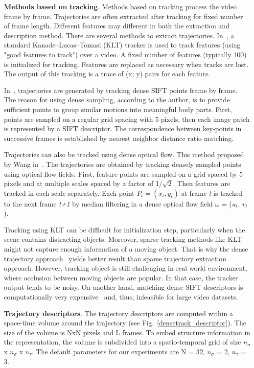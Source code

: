 \textbf{Methods based on tracking}. Methods based on tracking process the video frame by frame. Trajectories are often extracted after tracking for fixed number of frame length. Different features may different in both the extraction and description method. There are several methods to extract trajectories. In~\cite{Matikainen09ICCV}, a standard Kanade–Lucas–Tomasi (KLT) tracker is used to track features (using "good features to track") over a video. A fixed number of features (typically 100) is initialized for tracking. Features are replaced as necessary when tracks are lost. The output of this tracking is a trace of (x; y) pairs for each feature.

In~\cite{Yuan12PR}, trajectories are generated by tracking dense SIFT points frame by frame. The reason for using dense sampling, according to the author, is to provide sufficient points to group similar motions into meaningful body parts. First, points are sampled on a regular grid spacing with 5 pixels, then each image patch is represented by a SIFT descriptor. The correspondence between key-points in successive frames is established by nearest neighbor distance ratio matching.

Trajectories can also be tracked using dense optical flow. This method proposed by Wang in~\cite{wang:2011:inria-00583818:1,wang2013action}. The trajectories are obtained by tracking densely sampled points using optical flow fields. First, feature points are sampled on a grid spaced by 5 pixels and at multiple scales spaced by a factor of 1/$\sqrt{2}$. Then features are tracked in each scale separately. Each point $P_{t} = (x_{t}, y_{t})$ at frame \textit{t} is tracked to the next frame \textit{t+1} by median filtering in a dense optical flow field $\omega$ = ($u_{t}$, $v_{t}$).

Tracking using KLT can be difficult for initialization step, particularly when the scene contains distracting objects. Moreover, sparse tracking methods like KLT might not capture enough information of a moving object. That is why the dense trajectory approach~\cite{wang:2011:inria-00583818:1} yields better result than sparse trajectory extraction approach. However, tracking object is still challenging in real world environment, where occlusion between moving objects are popular. In that case, the tracker output tends to be noisy. On another hand, matching dense SIFT descriptors is computationally very expensive~\cite{LiuCe09CVPR} and, thus, infeasible for large video datasets. 

\textbf{Trajectory descriptors}. The trajectory descriptors are computed within a space-time volume around the trajectory (see Fig.~\ref{densetrack_descriptor}). The size of the volume is NxN pixels and L frames. To embed structure information in the representation, the volume is subdivided into a spatio-temporal grid of size $n_{\sigma}$ x $n_{\sigma}$ x $n_{\tau}$. The default parameters for our experiments are N = 32, $n_{\sigma}$ = 2, $n_{\tau}$ = 3.

